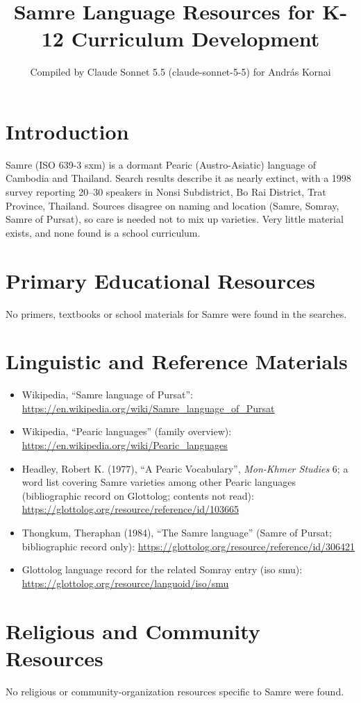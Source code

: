 \documentclass[12pt]{article}
\title{Samre Language Resources for K-12 Curriculum Development}
\author{Compiled by Claude Sonnet 5.5 (claude-sonnet-5-5) for Andr\'as Kornai}
\date{}
\begin{document}
\maketitle

\section{Introduction}
Samre (ISO 639-3 sxm) is a dormant Pearic (Austro-Asiatic) language of Cambodia and Thailand. Search results describe it as nearly extinct, with a 1998 survey reporting 20--30 speakers in Nonsi Subdistrict, Bo Rai District, Trat Province, Thailand. Sources disagree on naming and location (Samre, Somray, Samre of Pursat), so care is needed not to mix up varieties. Very little material exists, and none found is a school curriculum.

\section{Primary Educational Resources}
No primers, textbooks or school materials for Samre were found in the searches.

\section{Linguistic and Reference Materials}
\begin{itemize}
\item Wikipedia, ``Samre language of Pursat'': \url{https://en.wikipedia.org/wiki/Samre_language_of_Pursat}
\item Wikipedia, ``Pearic languages'' (family overview): \url{https://en.wikipedia.org/wiki/Pearic_languages}
\item Headley, Robert K. (1977), ``A Pearic Vocabulary'', \emph{Mon-Khmer Studies} 6; a word list covering Samre varieties among other Pearic languages (bibliographic record on Glottolog; contents not read): \url{https://glottolog.org/resource/reference/id/103665}
\item Thongkum, Theraphan (1984), ``The Samre language'' (Samre of Pursat; bibliographic record only): \url{https://glottolog.org/resource/reference/id/306421}
\item Glottolog language record for the related Somray entry (iso smu): \url{https://glottolog.org/resource/languoid/iso/smu}
\end{itemize}

\section{Religious and Community Resources}
No religious or community-organization resources specific to Samre were found.
\end{document}
